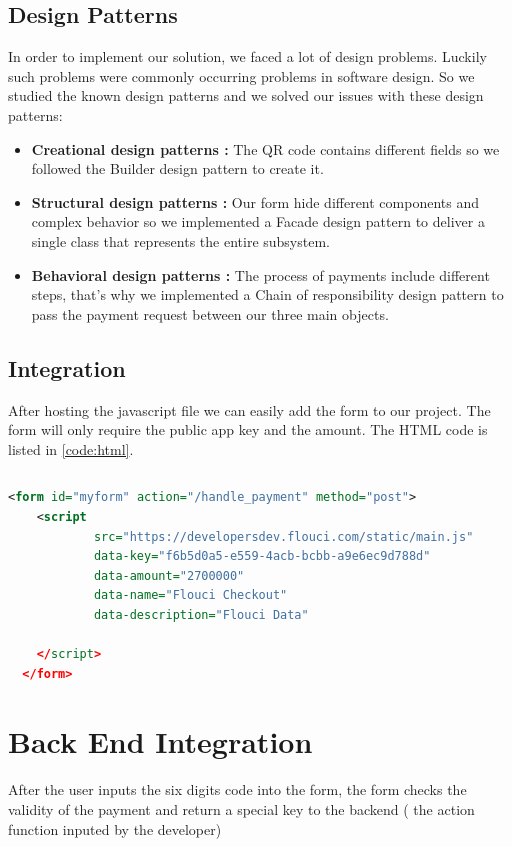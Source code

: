 \begin{spacing}{1.2}
\subsection{Design Patterns}
In order to implement our solution, we faced a lot of design problems. Luckily such problems were commonly occurring problems in software design. So we studied the known design patterns \cite{designpattern} and we solved our issues with these design patterns:
\begin{itemize}
	\item \textbf{Creational design patterns \cite{designpattern}:} The QR code contains different fields so we followed the Builder design pattern to create it.
	\item \textbf{Structural design patterns \cite{designpattern}:} Our form hide different components and complex behavior so we implemented a Facade design pattern to deliver a single class that
	 represents the entire subsystem.
	 \item \textbf{Behavioral design patterns \cite{designpattern}:} The process of payments include different steps, that's why we implemented a  Chain of responsibility design pattern to pass the payment request between our three main objects.
\end{itemize}
\subsection{Integration}
After hosting the javascript file we can easily add the form to our project. The form will only require the public app key  and the amount.
The HTML code is listed in \ref{code:html}.
\begin{lstlisting}[rulecolor=\color{white}]
\end{lstlisting}
\begin{lstlisting}[label=code:html,caption=Flouci Integration Java,language=xml]
 <form id="myform" action="/handle_payment" method="post">
    <script
            src="https://developersdev.flouci.com/static/main.js"
            data-key="f6b5d0a5-e559-4acb-bcbb-a9e6ec9d788d"
            data-amount="2700000"
            data-name="Flouci Checkout"
            data-description="Flouci Data"

    </script>
  </form>
\end{lstlisting}


\section{Back End Integration}
After the user inputs the six digits code into the form, the form checks the validity of the payment and return a special key to the backend ( the action function inputed by the developer)


\end{spacing}
